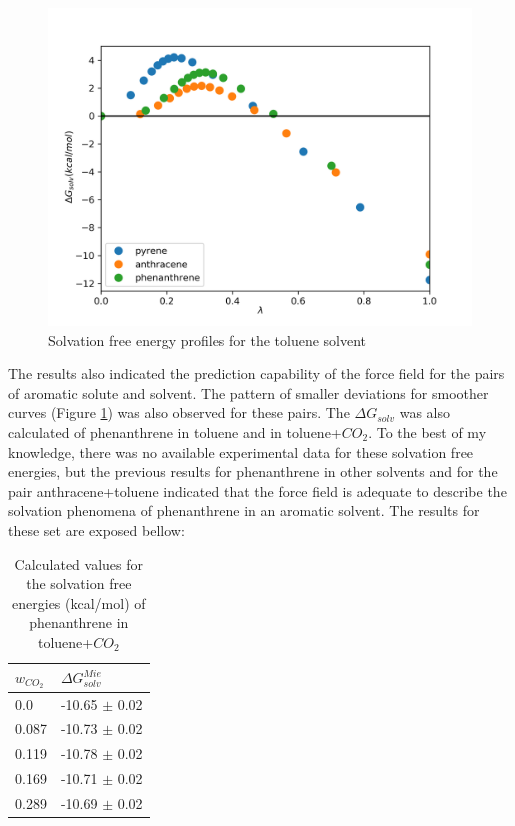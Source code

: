 \begin{figure}[H]
	\centering
    \includegraphics[width=0.9\linewidth]{Figures/tol}
    \caption{Solvation free energy profiles for the toluene solvent }
    \label{fig:tol}
\end{figure}

 The results also indicated the prediction capability of the force field for the pairs of aromatic solute and solvent. The pattern of smaller deviations for smoother curves (Figure \ref{fig:tol}) was also observed for these pairs. The $\Delta G_{solv}$ was also calculated of phenanthrene in toluene and in toluene+$CO_{2}$. To the best of my knowledge, there was no available experimental data for these solvation free energies, but the previous results for phenanthrene in other solvents and for the pair anthracene+toluene indicated that the force field is adequate to describe the solvation phenomena of phenanthrene in an aromatic solvent. The results for these set are exposed bellow: 
 
\FloatBarrier
\begin{table}[H]
\centering
  \caption{Calculated values for the solvation free energies (kcal/mol) of phenanthrene in toluene+$CO_{2}$}
  \label{tbl:solv3}
  \begin{tabular}{ll}
    \hline
      $w_{CO_{2}}$ & $\Delta G_{solv}^{Mie}$ \\
    \hline
    0.0    & -10.65 $\pm$ 0.02   \\
    0.087  & -10.73 $\pm$ 0.02   \\
    0.119  & -10.78 $\pm$ 0.02   \\
    0.169  & -10.71 $\pm$ 0.02   \\
    0.289  & -10.69 $\pm$ 0.02   \\
    \hline
  \end{tabular}
\end{table}
\FloatBarrier

